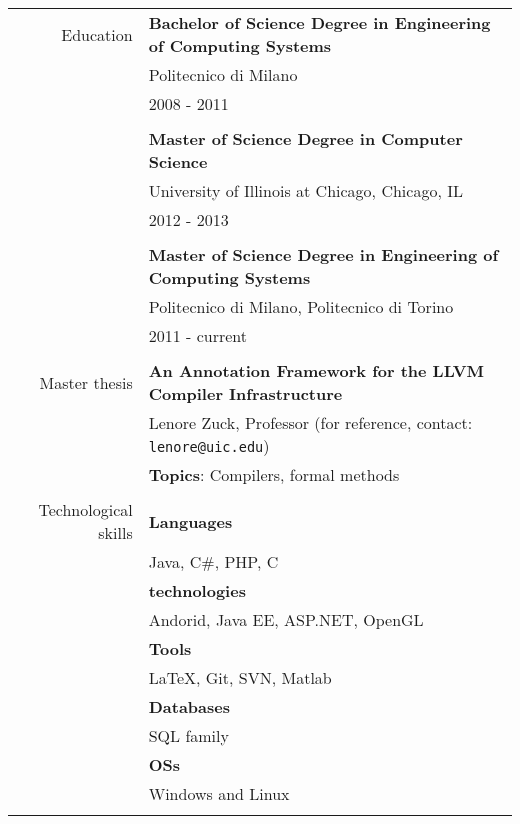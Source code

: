 
\vita

\begin{center}
\begin{singlespace}

\vspace{0.2in}

\begin{tabular}{r@{\hspace{0.2in}}|@{\hspace{0.2in}}p{4.5in}}

{\Large Education}
& \textbf{Bachelor of Science Degree in Engineering of Computing Systems} \\
& Politecnico di Milano \\
& 2008 - 2011 \\
\\
& \textbf{Master of Science Degree in Computer Science} \\
& University of Illinois at Chicago, Chicago, IL \\
& 2012 - 2013 \\
\\
& \textbf{Master of Science Degree in Engineering of Computing Systems} \\
& Politecnico di Milano, Politecnico di Torino \\
& 2011 - current \\
\\

{\Large Master thesis}
& \textbf{An Annotation Framework for the LLVM Compiler Infrastructure} \\
& Lenore Zuck, Professor (for reference, contact: \texttt{lenore@uic.edu}) \\
& \textbf{Topics}: Compilers, formal methods \\
\\

{\Large Technological skills}
& \textbf{Languages} \\
& Java, C\#, PHP, C \\
& \textbf{technologies} \\
& Andorid, Java EE, ASP.NET, OpenGL \\
& \textbf{Tools} \\
& \LaTeX, Git, SVN, Matlab \\
& \textbf{Databases} \\
& SQL family \\
& \textbf{OSs} \\
& Windows and Linux \\
\\
\end{tabular}



\end{singlespace}
\end{center}
